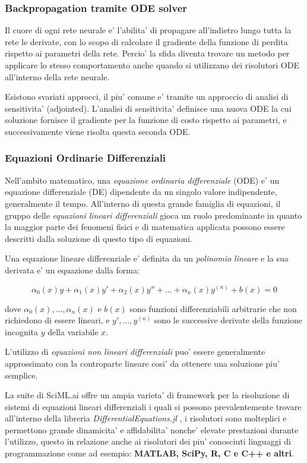 \subsubsection*{Backpropagation tramite ODE solver}
Il cuore di ogni rete neurale e' l'abilita' di propagare all'indietro \cite{wiki:Backpropagation} lungo tutta la 
rete le derivate, con lo scopo di calcolare il gradiente \cite{wiki:Gradiente_(funzione)} della funzione di perdita
rispetto ai parametri della rete. Percio' la sfida diventa trovare un metodo per
applicare lo stesso comportamento anche quando si utilizzano dei risolutori ODE 
all'interno della rete neurale.

Esistono svariati approcci, il piu' comune e' tramite un approccio di analisi di sensitivita' (adjointed).
L'analisi di sensitivita' definisce una nuova ODE la cui soluzione fornisce il gradiente per 
la funzione di costo rispetto ai parametri, e successivamente viene risolta questa seconda
ODE.

\subsubsection*{Equazioni Ordinarie Differenziali}
Nell'ambito matematico, una \emph{equazione ordinaria differenziale} (ODE) e' un 
equazione differenziale (DE) dipendente da un singolo valore indipendente, 
generalmente il tempo. All'interno di questa grande famiglia di equazioni, 
il gruppo delle \emph{equazioni lineari differenziali} gioca un ruolo predominante
in quanto la maggior parte dei fenomeni fisici e di matematica applicata possono 
essere descritti dalla soluzione di questo tipo di equazioni. 

Una equazione lineare differenziale e' definita da un \emph{polinomio lineare} 
e la sua derivata e' un equazione dalla forma:

$$\alpha_0(x)y + \alpha_1(x)y' + \alpha_2(x)y'' + ... + \alpha_n(x)y^{(n)} + b(x) = 0$$

dove $\alpha_0(x), ..., \alpha_n(x)$ e $b(x)$ sono funzioni differenziabili arbitrarie che non 
richiedono di essere lineari, e $y', ..., y^{(n)}$ sono le successive derivate della funzione incognita
$y$ della variabile $x$.

L'utilizzo di \emph{equazioni non lineari differenziali} puo' essere 
generalmente approssimato con la controparte lineare cosi' da ottenere una 
soluzione piu' semplice. 

La suite di SciML.ai offre un ampia varieta' di framework per la risoluzione di sistemi di 
equazioni lineari differenziali i quali si possono prevalentemente trovare 
all'interno della libreria \emph{DifferentialEquations.jl} \cite{rackauckas2017differentialequations}
\cite{rackauckas2019confederated} \cite{9622796} \cite{gowda2019sparsity},
i risolutori sono molteplici e permettono grande dinamicita' e affidabilita' 
nonche' elevate prestazioni durante l'utilizzo, questo in relazione anche ai risolutori dei piu' 
conosciuti linguaggi di programmazione come ad esempio: \textbf{MATLAB, SciPy, R, C e C++ e altri}.

